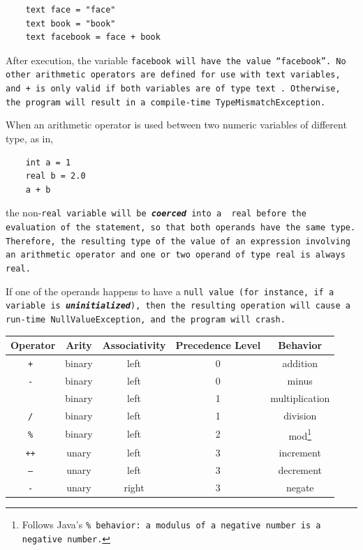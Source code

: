 \documentclass{article}
\begin{document}
\begin{verbatim}
    text face = "face"
    text book = "book"
    text facebook = face + book
\end{verbatim}

After execution, the variable \tt facebook \rm will have the value ``facebook''. No other arithmetic operators are defined for
use with \tt text \rm variables, and \tt + \rm is only valid if both variables are of type \tt text \rm. Otherwise, the program
will result in a compile-time \tt TypeMismatchException\rm. 

When an arithmetic operator is used between two numeric variables of different type, as in,

\begin{verbatim}
    int a = 1
    real b = 2.0
    a + b
\end{verbatim}

\noindent the non-\tt real \rm variable will be \textbf{\emph{coerced}} into a \tt
real \rm before the evaluation of the statement, so that both operands have the
same type. Therefore, the resulting type of the value of an expression involving
an arithmetic operator and one or two operand of type \tt real \rm is always \tt
real\rm.

If one of the operands happens to have a \tt null \rm value (for instance, if a variable is \textbf{\emph{uninitialized}}),
then the resulting operation will cause a run-time \tt NullValueException\rm, and the program will crash.

\begin{center}
\begin{tabular}{|c|c|c|c|c|}

\hline \textbf{Operator} & \textbf{Arity} & \textbf{Associativity} &
\textbf{Precedence Level} & \textbf{Behavior} \\ \hline
\tt + \rm & binary & left & 0 & addition \\ \hline
\tt - \rm & binary & left & 0 & minus \\ \hline
\tt * \rm & binary & left & 1 & multiplication \\ \hline
\tt / \rm & binary & left & 1 & division \\ \hline
\tt \% \rm & binary & left & 2 & mod\footnote{Follows Java's 
\tt \% \rm behavior: a modulus of a negative number is a negative number.} \\ 
\hline
\tt ++ \rm & unary & left & 3 & increment \\ \hline
\tt -- \rm & unary & left & 3 & decrement \\ \hline
\tt - \rm & unary & right & 3 & negate \\ \hline
\end{tabular}
\end{center}
\end{document}
